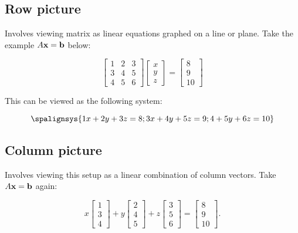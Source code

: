 \subsection{Row picture}

Involves viewing matrix as linear equations graphed on a line or plane. Take the example $A\textbf{x}=\textbf{b}$ below:

\[\begin{bmatrix}
        1&2&3\\
        3&4&5\\
        4&5&6
    \end{bmatrix}
    \begin{bmatrix}
        x\\y\\z
    \end{bmatrix}
    =
    \begin{bmatrix}
        8\\9\\10
    \end{bmatrix}
\]

This can be viewed as the following system:

\[
    \spalignsys{
    1x + 2y + 3z = 8 ;
    3x + 4y + 5z = 9 ;
     4 + 5y + 6z = 10
    }
\]

\subsection{Column picture}

Involves viewing this setup as a linear combination of column vectors. Take $A\textbf{x}=\textbf{b}$ again:

\[
    x\begin{bmatrix}
        1\\3\\4
    \end{bmatrix}
    +y\begin{bmatrix}
        2\\4\\5
    \end{bmatrix}
    +z\begin{bmatrix}
        3\\5\\6
    \end{bmatrix}
    =
    \begin{bmatrix}
        8\\9\\10
    \end{bmatrix}.
\]

